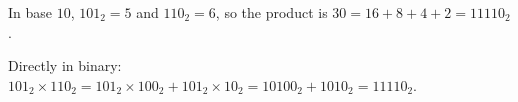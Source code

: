 In base $10$, $101_2=5$ and $110_2=6$, so the product is $30=16+8+4+2=\boxed{11110_2}$.

Directly in binary: $101_2\times110_2=101_2\times100_2+101_2\times10_2=10100_2+1010_2=11110_2$.
